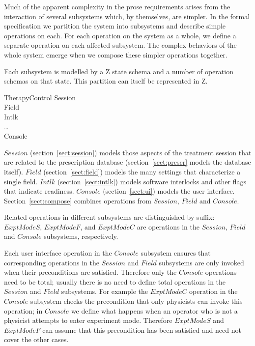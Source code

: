 \documentclass{article}
\begin{document}
Much of the apparent complexity in the prose requirements arises from
the interaction of several subsystems which, by themselves, are
simpler.  In the formal specification we partition the system
into subsystems and describe simple operations on each.  For each
operation on the system as a whole, we define a separate operation on
each affected subsystem.  The complex behaviors of the whole system
emerge when we compose these simpler operations together.  

Each subsystem is modelled by a Z state schema and a number of operation
schemas on that state. This partition can itself be represented in Z.

\begin{schema}{TherapyControl}
	Session \\
	Field \\
	Intlk \\
	\dots \\
	Console \\
\end{schema}
$Session$ (section~\ref{sect:session}) models those aspects of the
treatment session that are related to the prescription database
(section~\ref{sect:prescr} models the database itself).  $Field$
(section~\ref{sect:field}) models the many settings that characterize
a single field.  $Intlk$ (section~\ref{sect:intlk}) models software
interlocks and other flags that indicate readiness. $Console$
(section~\ref{sect:ui}) models the user interface.
Section~\ref{sect:compose} combines operations from $Session$, $Field$
and $Console$.

Related operations in different subsystems are distinguished by
suffix: $ExptModeS$, $ExptModeF$, and $ExptModeC$ are operations in
the $Session$, $Field$ and $Console$ subsystems, respectively.  

Each user interface operation in the $Console$ subsystem ensures that
corresponding operations in the $Session$ and $Field$ subsystems are only
invoked when their preconditions are satisfied.  Therefore only the
$Console$ operations need to be total; usually there is no need to
define total operations in the $Session$ and $Field$ subsystems.  For
example the $ExptModeC$ operation in the $Console$ subsystem checks the
precondition that only physicists can invoke this operation; in
$Console$ we define what happens when an operator who is not a
physicist attempts to enter experiment mode.  Therefore $ExptModeS$
and $ExptModeF$ can assume that this precondition has been satisfied
and need not cover the other cases.
\end{document}
